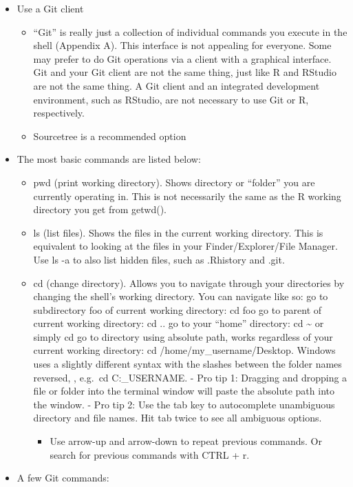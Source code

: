 \documentclass[
]{article}
\providecommand{\tightlist}{%
  \setlength{\itemsep}{0pt}\setlength{\parskip}{0pt}}
\begin{document}
\begin{itemize}
\item
  Use a Git client

  \begin{itemize}
  \tightlist
  \item
    ``Git'' is really just a collection of individual commands you
    execute in the shell (Appendix A). This interface is not
    appealing for everyone. Some may prefer to do Git operations via
    a client with a graphical interface. Git and your Git client are
    not the same thing, just like R and RStudio are not the same
    thing. A Git client and an integrated development environment,
    such as RStudio, are not necessary to use Git or R,
    respectively.
  \item
    Sourcetree is a recommended option
  \end{itemize}
\item
  The most basic commands are listed below:

  \begin{itemize}
  \item
    pwd (print working directory). Shows directory or ``folder'' you
    are currently operating in. This is not necessarily the same as
    the R working directory you get from getwd().
  \item
    ls (list files). Shows the files in the current working
    directory. This is equivalent to looking at the files in your
    Finder/Explorer/File Manager. Use ls -a to also list hidden
    files, such as .Rhistory and .git.
  \item
    cd (change directory). Allows you to navigate through your
    directories by changing the shell's working directory. You can
    navigate like so: go to subdirectory foo of current working
    directory: cd foo go to parent of current working directory: cd
    .. go to your ``home'' directory: cd \textasciitilde{} or simply cd go to
    directory using absolute path, works regardless of your current
    working directory: cd /home/my\_username/Desktop. Windows uses a
    slightly different syntax with the slashes between the folder
    names reversed, , e.g.~cd C:\Users\MY\_USERNAME\Desktop. - Pro
    tip 1: Dragging and dropping a file or folder into the terminal
    window will paste the absolute path into the window. - Pro tip
    2: Use the tab key to autocomplete unambiguous directory and
    file names. Hit tab twice to see all ambiguous options.

    \begin{itemize}
    \tightlist
    \item
      Use arrow-up and arrow-down to repeat previous commands. Or
      search for previous commands with CTRL + r.
    \end{itemize}
  \end{itemize}
\item
  A few Git commands:


\end{itemize}
\end{document}
